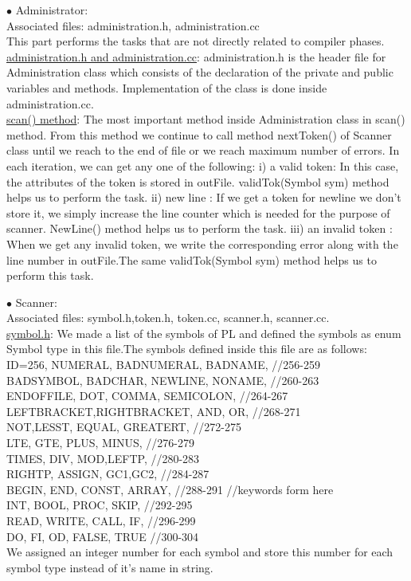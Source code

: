 \documentclass[paper=letter, fontsize=12pt]{scrartcl} %
\begin{document}
$\bullet$ Administrator:\\

Associated files: administration.h, administration.cc\\
This part performs the tasks that are not directly related to compiler phases.\\

\underline {administration.h and administration.cc}: administration.h is the header file for Administration class which consists of the declaration of the private and public variables and methods. Implementation of the class is done inside administration.cc.\\

\underline {scan() method}:  The most important method inside Administration class in scan() method. From this method we continue to call method nextToken() of Scanner class until we reach to the end of file or we reach maximum number of errors. In each iteration, we can get any one of the following:
	i)   a valid token: In this case, the attributes of the token is stored in outFile. validTok(Symbol sym) method helps us to perform the task.
	ii)  new line : If we get a token for newline we don't store it, we simply increase the line counter which is needed for the purpose of scanner. NewLine() method helps us to perform the task.
	iii) an invalid token : When we get any invalid token, we write the corresponding error along with the line number in outFile.The same validTok(Symbol sym) method helps us to perform this task.


$\bullet$ Scanner:\\

Associated files: symbol.h,token.h, token.cc, scanner.h, scanner.cc.\\

\underline {symbol.h}: We made a list of the symbols of PL and defined the symbols as enum Symbol type in this file.The symbols defined inside this file are as follows:\\

ID=256, NUMERAL, BADNUMERAL, BADNAME, //256-259\\ 
	BADSYMBOL, BADCHAR, NEWLINE, NONAME, //260-263\\
	ENDOFFILE, DOT, COMMA, SEMICOLON, //264-267\\
	LEFTBRACKET,RIGHTBRACKET, AND, OR, //268-271\\
	NOT,LESST, EQUAL, GREATERT, //272-275\\
	LTE, GTE, PLUS, MINUS, //276-279\\
	TIMES, DIV, MOD,LEFTP, //280-283\\
	RIGHTP, ASSIGN,	GC1,GC2, //284-287 \\
	BEGIN, END, CONST, ARRAY, //288-291  //keywords form here\\
	INT, BOOL, PROC, SKIP, //292-295\\
	READ, WRITE, CALL, IF, //296-299\\
	DO, FI, OD, FALSE, TRUE //300-304\\
We assigned an integer number for each symbol and store this number for each symbol type instead of it's name in string.\\
\end{document}

